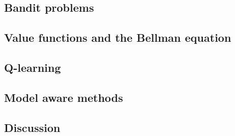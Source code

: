 
\subsection{Bandit problems}\label{ssec:1_rl_bandit}

\subsection{Value functions and the Bellman equation}\label{ssec:1_rl_seqDec}

\subsection{Q-learning}\label{ssec:1_rl_qlearning}

\subsection{Model aware methods}\label{ssec:1_rl_dp}

\subsection{Discussion}\label{ssec:1_rl_discu}


